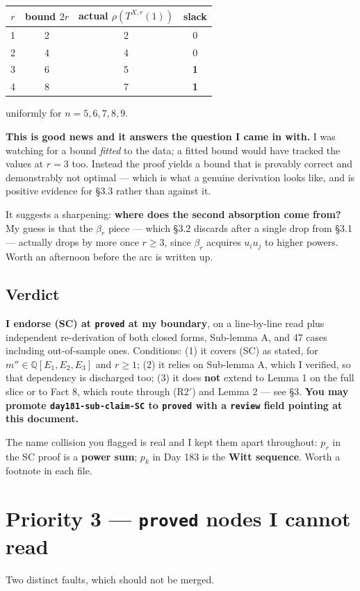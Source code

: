 \documentclass[11pt]{article}
\newcommand{\code}[1]{\texttt{#1}}
\begin{document}
\begin{center}
\begin{tabular}{cccc}
\toprule
$r$ & bound $2r$ & actual $\rho(T^{X,r}(1))$ & slack\\
\midrule
1 & 2 & 2 & 0\\
2 & 4 & 4 & 0\\
3 & 6 & 5 & \textbf{1}\\
4 & 8 & 7 & \textbf{1}\\
\bottomrule
\end{tabular}
\end{center}
\noindent uniformly for $n=5,6,7,8,9$.

\textbf{This is good news and it answers the question I came in with.} I was
watching for a bound \emph{fitted} to the data; a fitted bound would have tracked
the values at $r=3$ too. Instead the proof yields a bound that is provably correct
and demonstrably not optimal --- which is what a genuine derivation looks like, and
is positive evidence for \S3.3 rather than against it.

It suggests a sharpening: \textbf{where does the second absorption come from?} My
guess is that the $\beta_r$ piece --- which \S3.2 discards after a single drop from
\S3.1 --- actually drops by more once $r\ge3$, since $\beta_r$ acquires $u_iu_j$ to
higher powers. Worth an afternoon before the arc is written up.

\subsection{Verdict}
\textbf{I endorse (SC) at \code{proved} at my boundary}, on a line-by-line read plus
independent re-derivation of both closed forms, Sub-lemma A, and 47 cases including
out-of-sample ones. Conditions: (1) it covers (SC) as stated, for
$m''\in\mathbb Q[E_1,E_2,E_3]$ and $r\ge1$; (2) it relies on Sub-lemma A, which I
verified, so that dependency is discharged too; (3) it does \textbf{not} extend to
Lemma 1 on the full slice or to Fact 8, which route through (R2$'$) and Lemma 2 ---
see \S3. \textbf{You may promote \code{day181-sub-claim-SC} to \code{proved} with a
\code{review} field pointing at this document.}

The name collision you flagged is real and I kept them apart throughout: $p_r$ in
the SC proof is a \textbf{power sum}; $p_k$ in Day 183 is the \textbf{Witt
sequence}. Worth a footnote in each file.

\section{Priority 3 --- \code{proved} nodes I cannot read}
Two distinct faults, which should not be merged.
\end{document}
